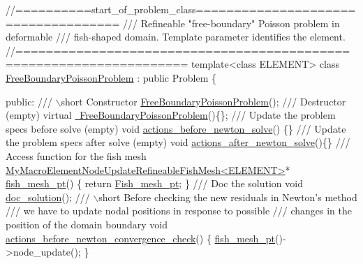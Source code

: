  
\begin{DoxyCodeInclude}
\textcolor{comment}{//==========start\_of\_problem\_class====================================}
\textcolor{comment}{/// Refineable "free-boundary" Poisson problem in deformable }
\textcolor{comment}{}\textcolor{comment}{/// fish-shaped domain. Template parameter identifies the element.}
\textcolor{comment}{}\textcolor{comment}{//====================================================================}
\textcolor{keyword}{template}<\textcolor{keyword}{class} ELEMENT>
\textcolor{keyword}{class }\hyperlink{classFreeBoundaryPoissonProblem}{FreeBoundaryPoissonProblem} : \textcolor{keyword}{public} Problem
\{

\textcolor{keyword}{public}:
\textcolor{comment}{}
\textcolor{comment}{ /// \(\backslash\)short  Constructor}
\textcolor{comment}{} \hyperlink{classFreeBoundaryPoissonProblem_a0efe7c342eea790fc0240830bc3c4ebc}{FreeBoundaryPoissonProblem}();
\textcolor{comment}{}
\textcolor{comment}{ /// Destructor (empty)}
\textcolor{comment}{} \textcolor{keyword}{virtual} \hyperlink{classFreeBoundaryPoissonProblem_a5b75b8553f3dfed4e9a8996c1b13edf3}{~FreeBoundaryPoissonProblem}()\{\};
\textcolor{comment}{}
\textcolor{comment}{ /// Update the problem specs before solve (empty)}
\textcolor{comment}{} \textcolor{keywordtype}{void} \hyperlink{classFreeBoundaryPoissonProblem_aeef57bd5dc79b6aba9eeadcd0c01a2e0}{actions\_before\_newton\_solve}() \{\}
\textcolor{comment}{}
\textcolor{comment}{ /// Update the problem specs after solve (empty)}
\textcolor{comment}{} \textcolor{keywordtype}{void} \hyperlink{classFreeBoundaryPoissonProblem_aa18df6c9a9287f67ae1bff0f67aaa625}{actions\_after\_newton\_solve}()\{\}
  \textcolor{comment}{}
\textcolor{comment}{ /// Access function for the fish mesh}
\textcolor{comment}{} \hyperlink{classMyMacroElementNodeUpdateRefineableFishMesh}{MyMacroElementNodeUpdateRefineableFishMesh<ELEMENT>}* 
      \hyperlink{classFreeBoundaryPoissonProblem_adccab51afed9228783120934b6be37c9}{fish\_mesh\_pt}() 
  \{
   \textcolor{keywordflow}{return} \hyperlink{classFreeBoundaryPoissonProblem_ae81a7e22c2c61854696b80a94053a663}{Fish\_mesh\_pt};
  \}
\textcolor{comment}{}
\textcolor{comment}{ /// Doc the solution}
\textcolor{comment}{} \textcolor{keywordtype}{void} \hyperlink{classFreeBoundaryPoissonProblem_a2282d8ac1d5753771a9a3cfc0417f6b6}{doc\_solution}();
\textcolor{comment}{}
\textcolor{comment}{ /// \(\backslash\)short Before checking the new residuals in Newton's method}
\textcolor{comment}{ /// we have to update nodal positions in response to possible }
\textcolor{comment}{ /// changes in the position of the domain boundary}
\textcolor{comment}{} \textcolor{keywordtype}{void} \hyperlink{classFreeBoundaryPoissonProblem_a885a6e3a4efd1f02314806dced566569}{actions\_before\_newton\_convergence\_check}()
  \{
   \hyperlink{classFreeBoundaryPoissonProblem_adccab51afed9228783120934b6be37c9}{fish\_mesh\_pt}()->node\_update();
  \}


\end{DoxyCodeInclude}

